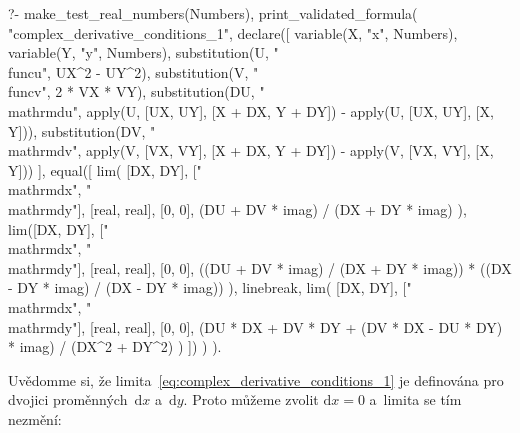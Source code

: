 \begin{prolog}
?-	make_test_real_numbers(Numbers),
	print_validated_formula(
		"complex_derivative_conditions_1",
		declare([
			variable(X, "x", Numbers),
			variable(Y, "y", Numbers),
			substitution(U, "\\func{u}", UX^2 - UY^2),
			substitution(V, "\\func{v}", 2 * VX * VY),
			substitution(DU, "\\mathrm{d}u", apply(U, [UX, UY], [X + DX, Y + DY]) - apply(U, [UX, UY], [X, Y])),
			substitution(DV, "\\mathrm{d}v", apply(V, [VX, VY], [X + DX, Y + DY]) - apply(V, [VX, VY], [X, Y]))
		],
			equal([
				lim(
					[DX, DY], ["\\mathrm{d}x", "\\mathrm{d}y"], [real, real], [0, 0],
					(DU + DV * imag) / (DX + DY * imag)
				),
				lim([DX, DY], ["\\mathrm{d}x", "\\mathrm{d}y"], [real, real], [0, 0],
					((DU + DV * imag) / (DX + DY * imag)) * ((DX - DY * imag) / (DX - DY * imag))	
				),
				linebreak,
				lim(
					[DX, DY], ["\\mathrm{d}x", "\\mathrm{d}y"], [real, real], [0, 0],
					(DU * DX + DV * DY + (DV * DX - DU * DY) * imag) / (DX^2 + DY^2)
				)
			])
		)
	).
\end{prolog}

Uvědomme si, že limita~\eqref{eq:complex_derivative_conditions_1} je definována pro dvojici proměnných~\(\mathrm{d}x\) a~\(\mathrm{d}y\). Proto můžeme zvolit \(\mathrm{d}x = 0\) a~limita se tím nezmění:

